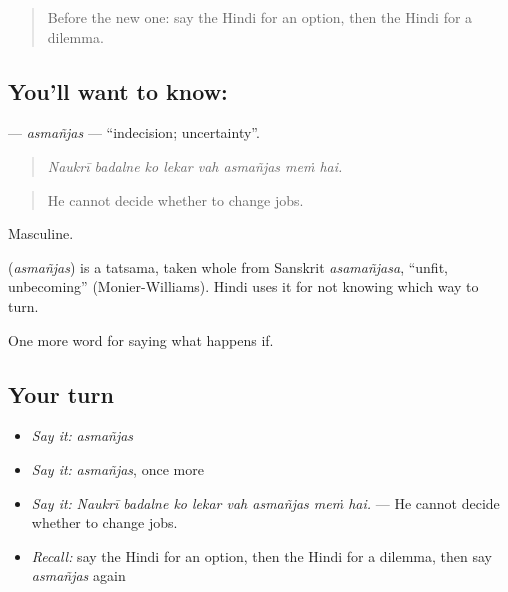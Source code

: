 \label{lesson:HI-C549-asmanjas}



\begin{quote}
Before the new one: say the Hindi for an option, then the Hindi for a dilemma.
\end{quote}

\subsection*{You'll want to know: }
\textbf{} — \emph{asmañjas} — \textquotedblleft{}indecision; uncertainty\textquotedblright{}.

\begin{quote}
       
\end{quote}

\begin{quote}
\emph{Naukrī badalne ko lekar vah asmañjas meṁ hai.}
\end{quote}

\begin{quote}
He cannot decide whether to change jobs.
\end{quote}

Masculine.

\begin{cousinweb}
\textbf{} (\emph{asmañjas}) is a tatsama, taken whole from Sanskrit \emph{asamañjasa}, \textquotedblleft{}unfit, unbecoming\textquotedblright{} (Monier-Williams). Hindi uses it for not knowing which way to turn.
\end{cousinweb}

\begin{grammarlens}[title={What you've built}]
One more word for saying what happens if.
\end{grammarlens}

\subsection*{Your turn}
\begin{itemize}
\raggedright
  \item \emph{Say it:} \emph{asmañjas}
  \item \emph{Say it:} \emph{asmañjas}, once more
  \item \emph{Say it:} \emph{Naukrī badalne ko lekar vah asmañjas meṁ hai.} — He cannot decide whether to change jobs.
  \item \emph{Recall:} say the Hindi for an option, then the Hindi for a dilemma, then say \emph{asmañjas} again
\end{itemize}

